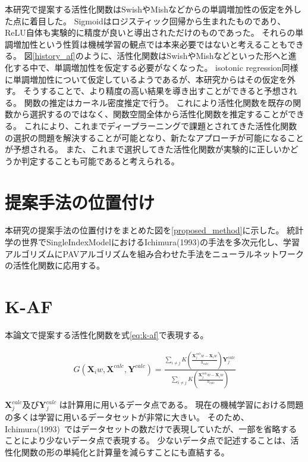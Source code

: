 本研究で提案する活性化関数はSwishやMishなどからの単調増加性の仮定を外した点に着目した。
Sigmoidはロジスティック回帰から生まれたものであり、ReLU自体も実験的に精度が良いと導出されただけのものであった。
それらの単調増加性という性質は機械学習の観点では本来必要ではないと考えることもできる。
図\ref{history_af}のように、活性化関数はSwishやMishなどといった形へと進化する中で、単調増加性を仮定する必要がなくなった。
isotonic regression同様に単調増加性について仮定しているようであるが、本研究からはその仮定を外す。
そうすることで、より精度の高い結果を導き出すことができると予想される。
関数の推定はカーネル密度推定で行う。
これにより活性化関数を既存の関数から選択するのではなく、関数空間全体から活性化関数を推定することができる。
これにより、これまでディープラーニングで課題とされてきた活性化関数の選択の問題を解決することが可能となり、新たなアプローチが可能になることが予想される。
また、これまで選択してきた活性化関数が実験的に正しいかどうか判定することも可能であると考えられる。


\section{提案手法の位置付け}
\label {position_proposed}

本研究の提案手法の位置付けをまとめた図を\ref{proposed_method}に示した。
統計学の世界でSingleIndexModelにおけるIchimura(1993)の手法を多次元化し、学習アルゴリズムにPAVアルゴリズムを組み合わせた手法をニューラルネットワークの活性化関数に応用する。



\section{K-AF}
\label {math}
本論文で提案する活性化関数を式\ref{eq:k-af}で表現する。

\begin{eqnarray}
G(\mathbf{X}_iw, \mathbf{X}^{calc}, \mathbf{Y}^{calc})=\frac{\sum_{i\neq j} K\left(\frac{\mathbf{X}^{calc}_j w - \mathbf{X}_i w}{h_{calc}}\right)\mathbf{Y}^{calc}_j}{\sum_{i\neq j} K\left(\frac{\mathbf{X}^{calc}_j w - \mathbf{X}_i w}{h_{calc}}\right)}
\label{eq:k-af}
\end{eqnarray}


$ \mathbf{X}^{calc}_j $及び$ \mathbf{Y}^{calc}_j $ は計算用に用いるデータ点である。
現在の機械学習における問題の多くは学習に用いるデータセットが非常に大きい。
そのため、Ichimura(1993)~\cite{ichimura}ではデータセットの数だけで表現していたが、一部を省略することにより少ないデータ点で表現する。
少ないデータ点で記述することは、活性化関数の形の単純化と計算量を減らすことにも直結する。

